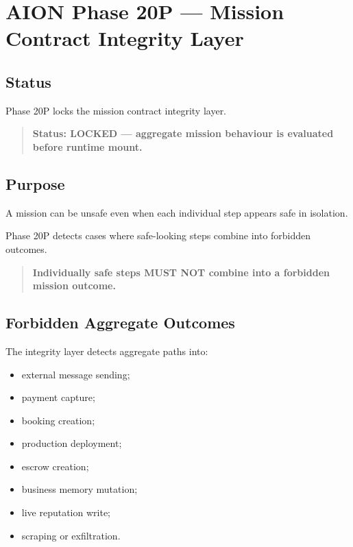 \section{AION Phase 20P --- Mission Contract Integrity Layer}
\label{sec:aion-phase20p-mission-contract-integrity}

\subsection{Status}

Phase 20P locks the mission contract integrity layer.

\begin{quote}
\textbf{Status: LOCKED --- aggregate mission behaviour is evaluated before runtime mount.}
\end{quote}

\subsection{Purpose}

A mission can be unsafe even when each individual step appears safe in isolation.

Phase 20P detects cases where safe-looking steps combine into forbidden outcomes.

\begin{quote}
\textbf{Individually safe steps MUST NOT combine into a forbidden mission outcome.}
\end{quote}

\subsection{Forbidden Aggregate Outcomes}

The integrity layer detects aggregate paths into:

\begin{itemize}
  \item external message sending;
  \item payment capture;
  \item booking creation;
  \item production deployment;
  \item escrow creation;
  \item business memory mutation;
  \item live reputation write;
  \item scraping or exfiltration.
\end{itemize}

